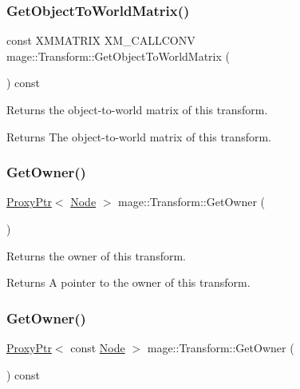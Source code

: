 \subsubsection{\texorpdfstring{Get\+Object\+To\+World\+Matrix()}{GetObjectToWorldMatrix()}}
{\footnotesize\ttfamily const X\+M\+M\+A\+T\+R\+IX X\+M\+\_\+\+C\+A\+L\+L\+C\+O\+NV mage\+::\+Transform\+::\+Get\+Object\+To\+World\+Matrix (\begin{DoxyParamCaption}{ }\end{DoxyParamCaption}) const\hspace{0.3cm}{\ttfamily [noexcept]}}

Returns the object-\/to-\/world matrix of this transform.

\begin{DoxyReturn}{Returns}
The object-\/to-\/world matrix of this transform. 
\end{DoxyReturn}
\mbox{\label{classmage_1_1_transform_afc6a2f11abb7d13de831f2c78470dc04}} 
\subsubsection{\texorpdfstring{Get\+Owner()}{GetOwner()}\hspace{0.1cm}{\footnotesize\ttfamily [1/2]}}
{\footnotesize\ttfamily \mbox{\hyperlink{classmage_1_1_proxy_ptr}{Proxy\+Ptr}}$<$ \mbox{\hyperlink{classmage_1_1_node}{Node}} $>$ mage\+::\+Transform\+::\+Get\+Owner (\begin{DoxyParamCaption}{ }\end{DoxyParamCaption})\hspace{0.3cm}{\ttfamily [noexcept]}}

Returns the owner of this transform.

\begin{DoxyReturn}{Returns}
A pointer to the owner of this transform. 
\end{DoxyReturn}
\mbox{\label{classmage_1_1_transform_a90132f710e641238f3a988ffdbcc1a8b}} 
\subsubsection{\texorpdfstring{Get\+Owner()}{GetOwner()}\hspace{0.1cm}{\footnotesize\ttfamily [2/2]}}
{\footnotesize\ttfamily \mbox{\hyperlink{classmage_1_1_proxy_ptr}{Proxy\+Ptr}}$<$ const \mbox{\hyperlink{classmage_1_1_node}{Node}} $>$ mage\+::\+Transform\+::\+Get\+Owner (\begin{DoxyParamCaption}{ }\end{DoxyParamCaption}) const\hspace{0.3cm}{\ttfamily [noexcept]}}

